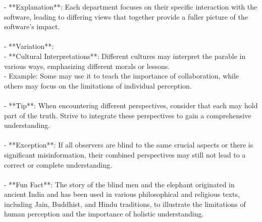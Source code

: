 \documentclass[a4paper,12pt,single,pdftex]{scrartcl}
\begin{document}
    
        - **Explanation**: Each department focuses on their specific interaction with the software, leading to differing views that together provide a fuller picture of the software's impact.
    \\

    
      
    \\

    
      - **Variation**:
    \\

    
        - **Cultural Interpretations**: Different cultures may interpret the parable in various ways, emphasizing different morals or lessons.
    \\

    
          - Example: Some may use it to teach the importance of collaboration, while others may focus on the limitations of individual perception.
    \\

    
      
    \\

    
      - **Tip**: When encountering different perspectives, consider that each may hold part of the truth. Strive to integrate these perspectives to gain a comprehensive understanding.
    \\

    
      
    \\

    
      - **Exception**: If all observers are blind to the same crucial aspects or there is significant misinformation, their combined perspectives may still not lead to a correct or complete understanding.
    \\

    
      
    \\

    
      - **Fun Fact**: The story of the blind men and the elephant originated in ancient India and has been used in various philosophical and religious texts, including Jain, Buddhist, and Hindu traditions, to illustrate the limitations of human perception and the importance of holistic understanding.
    \\
\end{document}
